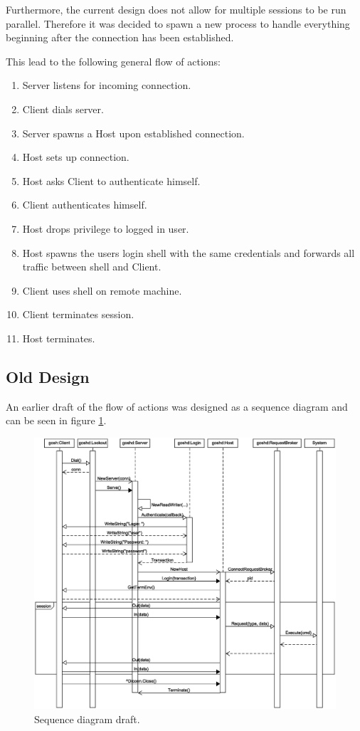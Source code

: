 \documentclass[10pt,a4paper,titlepage,twoside,english,final]{zhawreprt}
\begin{document}
Furthermore, the current design does not allow for multiple sessions to be run parallel.
Therefore it was decided to spawn a new process to handle everything beginning after the connection has been established.

This lead to  the following general flow of actions:

\begin{enumerate}
\item Server listens for incoming connection.
\item Client dials server.
\item Server spawns a Host upon established connection.
\item Host sets up connection.
\item Host asks Client to authenticate himself.
\item Client authenticates himself.
\item Host drops privilege to logged in user.
\item Host spawns the users login \gls{shell} with the same credentials and forwards all traffic between \gls{shell} and Client.
\item Client uses \gls{shell} on remote machine.
\item Client terminates session.
\item Host terminates.
\end{enumerate}

\newpage
\subsection{Old Design}\label{ssec:OldDesign}
An earlier draft of the flow of actions was designed as a sequence diagram and can be seen in figure \ref{fig:SeqDiaOriginal}.
\begin{figure}[ht]
\includegraphics[width=\textwidth]{SequenceDiagram}
\caption{Sequence diagram draft.}
\label{fig:SeqDiaOriginal}
\end{figure}
\end{document}
